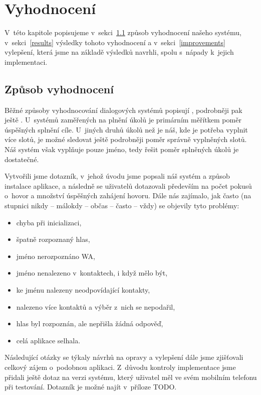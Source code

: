 \chapter{Vyhodnocení}\label{chapter-results}

V~této kapitole popisujeme v~sekci~\ref{methods} způsob vyhodnocení našeho systému,
v~sekci~\ref{results} výsledky tohoto vyhodnocení a v~sekci~\ref{improvements}
vylepšení, která jsme na základě výsledků navrhli, spolu s~nápady k~jejich implementaci.

\section{Způsob vyhodnocení}\label{methods}

Běžné způsoby vyhodnocování dialogových systémů popisují
\citet[sekce 24.5]{jurafsky_slp_2020}, podrobněji pak ještě \citet{Deriu_2020}.
U~systémů zaměřených na plnění úkolů je primárním měřítkem poměr úspěšných
splnění cíle. U~jiných druhů úkolů než je náš, kde je potřeba vyplnit více slotů, je možné
sledovat ještě podrobněji poměr správně vyplněných slotů. Náš systém však
vyplňuje pouze jméno, tedy řešit poměr splněných úkolů je dostatečné.

Vytvořili jsme dotazník, v~jehož úvodu jsme popsali náš systém a způsob instalace
aplikace, a následně se uživatelů dotazovali především na počet pokusů o~hovor a
množství úspěšných zahájení hovoru. Dále nás zajímalo, jak často (na stupnici
nikdy -- málokdy -- občas -- často -- vždy) se objevily
tyto problémy:
\begin{itemize}
    \item chyba při inicializaci,
    \item špatně rozpoznaný hlas,
    \item jméno nerozpoznáno WA,
    \item jméno nenalezeno v~kontaktech, i když mělo být,
    \item ke jménu nalezeny neodpovídající kontakty,
    \item nalezeno více kontaktů a výběr z~nich se nepodařil,
    \item hlas byl rozpoznán, ale nepřišla žádná odpověď,
    \item celá aplikace selhala.
\end{itemize}
Následující otázky se týkaly návrhů na opravy a vylepšení dále jsme zjišťovali celkový
zájem o~podobnou aplikaci. Z~důvodu kontroly implementace jsme přidali ještě
dotaz na verzi systému, který uživatel měl ve svém mobilním telefonu při testování. Dotazník je
možné najít v~příloze TODO.

